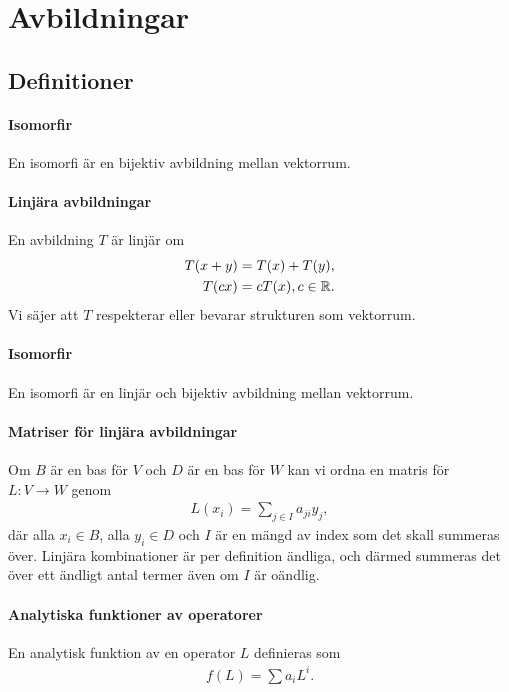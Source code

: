 \section{Avbildningar}

\subsection{Definitioner}

\paragraph{Isomorfir}
En isomorfi är en bijektiv avbildning mellan vektorrum.

\paragraph{Linjära avbildningar}
En avbildning $T$ är linjär om
\begin{align*}
	T(x + y) = T(x) + T(y), \\
	T(cx) = cT(x), c\in\mathbb{R}.
\end{align*}
Vi säjer att $T$ respekterar eller bevarar strukturen som vektorrum.

\paragraph{Isomorfir}
En isomorfi är en linjär och bijektiv avbildning mellan vektorrum.

\paragraph{Matriser för linjära avbildningar}
Om $B$ är en bas för $V$ och $D$ är en bas för $W$ kan vi ordna en matris för $L: V\to W$ genom
\begin{align*}
	L(x_{i}) = \sum\limits_{j\in I}a_{ji}y_{j},
\end{align*}
där alla $x_{i}\in B$, alla $y_{i}\in D$ och $I$ är en mängd av index som det skall summeras över. Linjära kombinationer är per definition ändliga, och därmed summeras det över ett ändligt antal termer även om $I$ är oändlig.

\paragraph{Analytiska funktioner av operatorer}
En analytisk funktion av en operator $L$ definieras som
\begin{align*}
	f(L) = \sum a_{i}L^{i}.
\end{align*}

